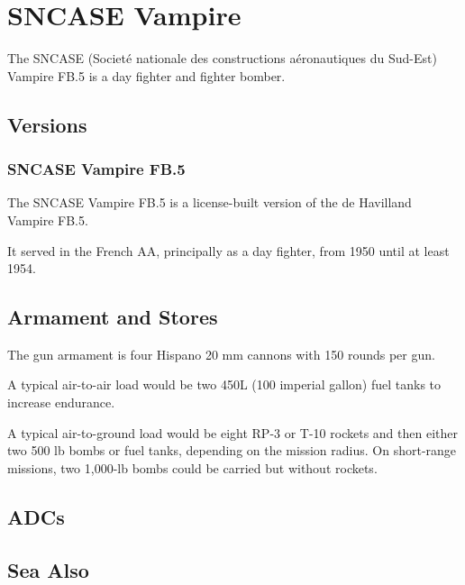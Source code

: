 \section{SNCASE Vampire}

The SNCASE (Societé nationale des constructions aéronautiques du Sud-Est) Vampire FB.5 is a day fighter and fighter bomber. 

\subsection{Versions}

\subsubsection{SNCASE Vampire FB.5}

The SNCASE Vampire FB.5 is a license-built version of the de Havilland Vampire FB.5.

It served in the French AA, principally as a day fighter, from 1950 until at least 1954.

\subsection{Armament and Stores}

The gun armament is four Hispano 20 mm cannons with 150 rounds per gun. 

A typical air-to-air load would be two 450L (100 imperial gallon) fuel tanks to increase endurance. 

A typical air-to-ground load would be eight RP-3 or T-10 rockets and then either two 500 lb bombs or fuel tanks, depending on the mission radius. On short-range missions, two 1,000-lb bombs could be carried but without rockets.

\subsection{ADCs}

\begin{adclist}
\end{adclist}

\subsection{Sea Also}

\begin{typelist}
\end{typelist}